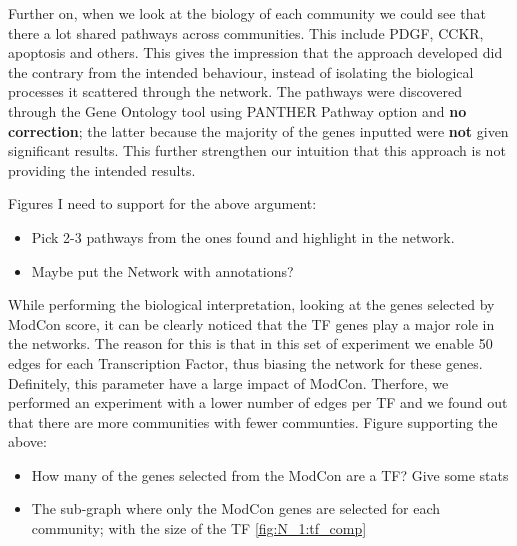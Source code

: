 Further on, when we look at the biology of each community we could see that there a lot shared pathways across communities. This include PDGF, CCKR, apoptosis and others. This gives the impression that the approach developed did the contrary from the intended behaviour, instead of isolating the biological processes it scattered through the network. The pathways were discovered through the Gene Ontology tool using PANTHER Pathway option and \textbf{no correction}; the latter because the majority of the genes inputted were \textbf{not} given significant results. This further strengthen our intuition that this approach is not providing the intended results.

Figures I need to support for the above argument:
\begin{itemize}
    \item Pick 2-3 pathways from the ones found and highlight in the network.
    \item Maybe put the Network with annotations?
\end{itemize}

While performing the biological interpretation, looking at the genes selected by ModCon score, it can be clearly noticed that the TF genes play a major role in the networks. The reason for this is that in this set of experiment we enable 50 edges for each Transcription Factor, thus biasing the network for these genes. Definitely, this parameter have a large impact of ModCon. Therfore, we performed an experiment with a lower number of edges per TF and we found out that there are more communities with fewer communties.
Figure supporting the above:
\begin{itemize}
    \item How many of the genes selected from the ModCon are a TF? Give some stats
    \item The sub-graph where only the ModCon genes are selected for each community; with the size of the TF \ref{fig:N_1:tf_comp}
\end{itemize}

